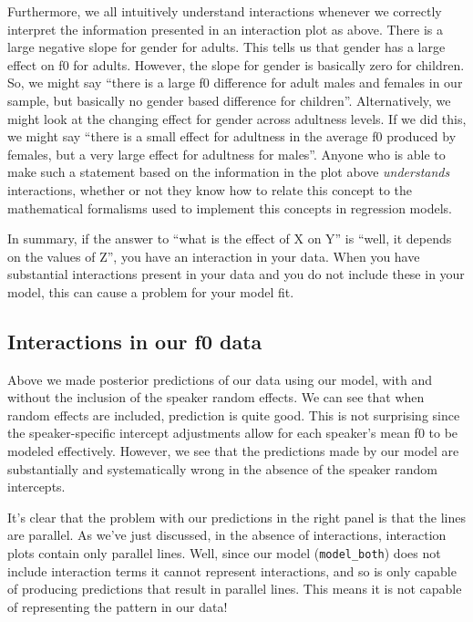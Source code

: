 \documentclass[
]{book}
\begin{document}
Furthermore, we all intuitively understand interactions whenever we correctly interpret the information presented in an interaction plot as above. There is a large negative slope for gender for adults. This tells us that gender has a large effect on f0 for adults. However, the slope for gender is basically zero for children. So, we might say ``there is a large f0 difference for adult males and females in our sample, but basically no gender based difference for children''. Alternatively, we might look at the changing effect for gender across adultness levels. If we did this, we might say ``there is a small effect for adultness in the average f0 produced by females, but a very large effect for adultness for males''. Anyone who is able to make such a statement based on the information in the plot above \emph{understands} interactions, whether or not they know how to relate this concept to the mathematical formalisms used to implement this concepts in regression models.

In summary, if the answer to ``what is the effect of X on Y'' is ``well, it depends on the values of Z'', you have an interaction in your data. When you have substantial interactions present in your data and you do not include these in your model, this can cause a problem for your model fit.

\hypertarget{interactions-in-our-f0-data}{%
\subsection{Interactions in our f0 data}\label{interactions-in-our-f0-data}}

Above we made posterior predictions of our data using our model, with and without the inclusion of the speaker random effects. We can see that when random effects are included, prediction is quite good. This is not surprising since the speaker-specific intercept adjustments allow for each speaker's mean f0 to be modeled effectively. However, we see that the predictions made by our model are substantially and systematically wrong in the absence of the speaker random intercepts.

It's clear that the problem with our predictions in the right panel is that the lines are parallel. As we've just discussed, in the absence of interactions, interaction plots contain only parallel lines. Well, since our model (\texttt{model\_both}) does not include interaction terms it cannot represent interactions, and so is only capable of producing predictions that result in parallel lines. This means it is not capable of representing the pattern in our data!
\end{document}
